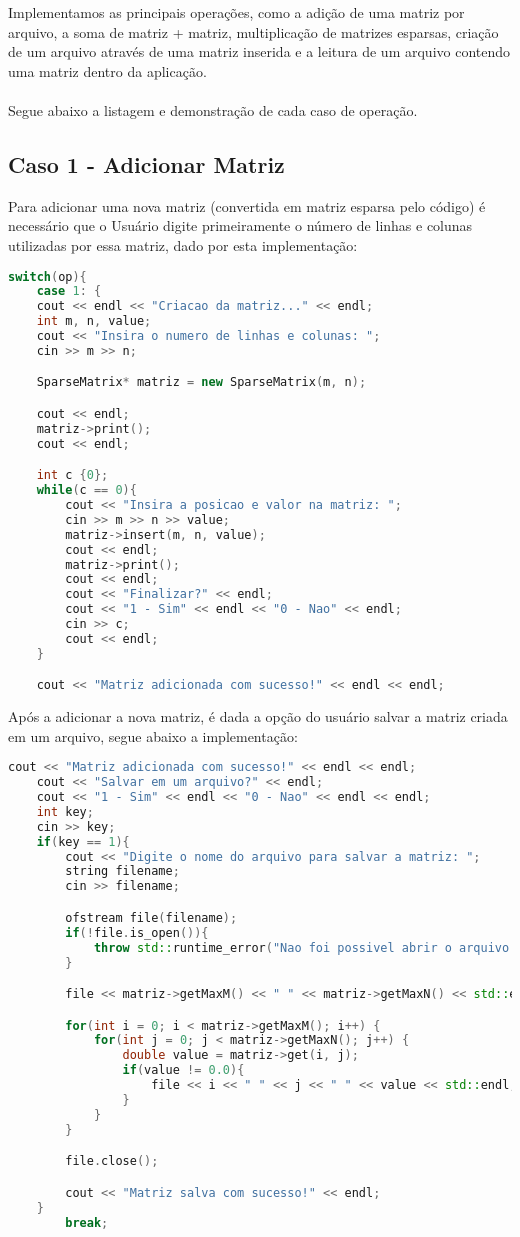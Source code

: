 \documentclass[a4paper,12pt]{article}
\begin{document}
Implementamos as principais operações, como a adição de uma matriz por arquivo, a soma de matriz + matriz, multiplicação de matrizes esparsas, criação de um arquivo através de uma matriz inserida e a leitura de um arquivo contendo uma matriz dentro da aplicação.
\\\\
Segue abaixo a listagem e demonstração de cada caso de operação.

\subsection{Caso 1 - Adicionar Matriz}

Para adicionar uma nova matriz (convertida em matriz esparsa pelo código) é necessário que o Usuário digite primeiramente o número de linhas e colunas utilizadas por essa matriz, dado por esta implementação:
\begin{lstlisting}[language=C++]
switch(op){
    case 1: {
    cout << endl << "Criacao da matriz..." << endl;
    int m, n, value;
    cout << "Insira o numero de linhas e colunas: ";
    cin >> m >> n;

    SparseMatrix* matriz = new SparseMatrix(m, n);

    cout << endl;
    matriz->print();
    cout << endl;

    int c {0};
    while(c == 0){
        cout << "Insira a posicao e valor na matriz: ";
        cin >> m >> n >> value;
        matriz->insert(m, n, value);
        cout << endl;
        matriz->print();
        cout << endl;
        cout << "Finalizar?" << endl;
        cout << "1 - Sim" << endl << "0 - Nao" << endl;
        cin >> c;
        cout << endl;
    }

    cout << "Matriz adicionada com sucesso!" << endl << endl;
\end{lstlisting}

Após a adicionar a nova matriz, é dada a opção do usuário salvar a matriz criada em um arquivo, segue abaixo a implementação:
\begin{lstlisting}[language=C++]
    cout << "Matriz adicionada com sucesso!" << endl << endl;
    cout << "Salvar em um arquivo?" << endl;
    cout << "1 - Sim" << endl << "0 - Nao" << endl << endl;
    int key;
    cin >> key;
    if(key == 1){
        cout << "Digite o nome do arquivo para salvar a matriz: ";
        string filename;
        cin >> filename;

        ofstream file(filename);
        if(!file.is_open()){
            throw std::runtime_error("Nao foi possivel abrir o arquivo: " + filename);
        }

        file << matriz->getMaxM() << " " << matriz->getMaxN() << std::endl;

        for(int i = 0; i < matriz->getMaxM(); i++) {
            for(int j = 0; j < matriz->getMaxN(); j++) {
                double value = matriz->get(i, j);
                if(value != 0.0){
                    file << i << " " << j << " " << value << std::endl;
                }
            }
        }

        file.close();

        cout << "Matriz salva com sucesso!" << endl;
    }
        break;
\end{lstlisting}
\end{document}
